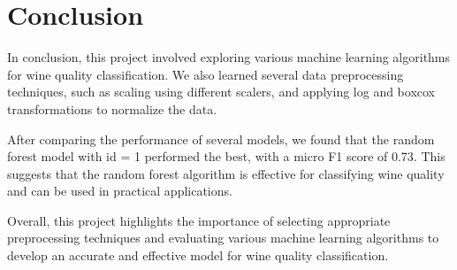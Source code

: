 \chapter{Conclusion}
In conclusion, this project involved exploring various machine learning algorithms for wine quality classification. We also learned several data preprocessing techniques, such as scaling using different scalers, and applying log and boxcox transformations to normalize the data.

After comparing the performance of several models, we found that the random forest model with id = 1 performed the best, with a micro F1 score of 0.73. This suggests that the random forest algorithm is effective for classifying wine quality and can be used in practical applications.

Overall, this project highlights the importance of selecting appropriate preprocessing techniques and evaluating various machine learning algorithms to develop an accurate and effective model for wine quality classification.

